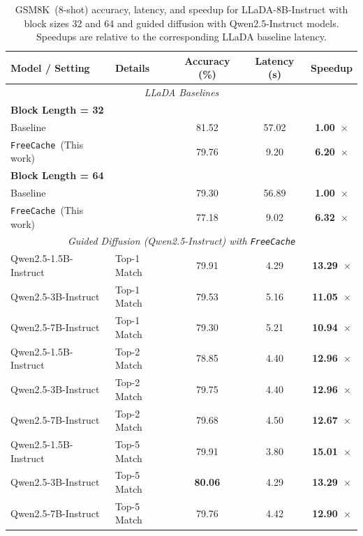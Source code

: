 \begin{table}[h!]
\caption{GSM8K~(8-shot) accuracy, latency, and speedup for LLaDA-8B-Instruct with block sizes 32 and 64 and guided diffusion with Qwen2.5-Instruct models. Speedups are relative to the corresponding LLaDA baseline latency.}
\vspace{0.2em}
\centering
\begin{tabular}{llccc}
\toprule
\textbf{Model / Setting} & \textbf{Details} & \textbf{Accuracy (\%)} & \textbf{Latency (s)} & \textbf{Speedup} \\
\midrule
\multicolumn{5}{c}{\textit{LLaDA Baselines}} \\
\midrule
\multicolumn{5}{l}{\textbf{Block Length = 32}} \\
Baseline &  & 81.52 & 57.02 & \textbf{1.00~$\times$} \\
\texttt{FreeCache}~(This work) &  & 79.76 & 9.20 & \textbf{6.20~$\times$} \\
\midrule
\multicolumn{5}{l}{\textbf{Block Length = 64}} \\
Baseline &  & 79.30 & 56.89 & \textbf{1.00~$\times$} \\
\texttt{FreeCache}~(This work) &  & 77.18 & 9.02 & \textbf{6.32~$\times$} \\
\midrule
\multicolumn{5}{c}{\textit{Guided Diffusion (Qwen2.5-Instruct) with \texttt{FreeCache}}} \\
\midrule
Qwen2.5-1.5B-Instruct & Top-1 Match & 79.91 & 4.29 & \textbf{13.29~$\times$} \\
Qwen2.5-3B-Instruct   & Top-1 Match & 79.53 & 5.16 & \textbf{11.05~$\times$} \\
Qwen2.5-7B-Instruct   & Top-1 Match & 79.30 & 5.21 & \textbf{10.94~$\times$} \\
Qwen2.5-1.5B-Instruct & Top-2 Match & 78.85 & 4.40 & \textbf{12.96~$\times$} \\
Qwen2.5-3B-Instruct   & Top-2 Match & 79.75 & 4.40 & \textbf{12.96~$\times$} \\
Qwen2.5-7B-Instruct   & Top-2 Match & 79.68 & 4.50 & \textbf{12.67~$\times$} \\
Qwen2.5-1.5B-Instruct & Top-5 Match & 79.91 & 3.80 & \textbf{15.01~$\times$} \\
Qwen2.5-3B-Instruct   & Top-5 Match & \textbf{80.06} & 4.29 & \textbf{13.29~$\times$} \\
Qwen2.5-7B-Instruct   & Top-5 Match & 79.76 & 4.42 & \textbf{12.90~$\times$} \\
\bottomrule
\end{tabular}
\label{tab:combined-llada-guided}
\end{table}
